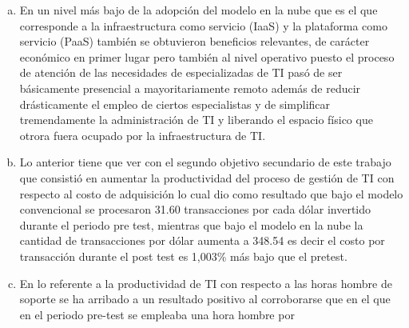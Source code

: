 \begin{enumerate}[a.]
          como consecuencia se obtuvo un incremento en las ventas de 12\% con
          respecto al periodo anterior. Nuevamente en este caso la manifestaci\'on
          tangible de beneficio se da por el porcentaje de incremento en las ventas,
          sin embargo se obtuvieron otros beneficios menos evidentes como la
          recolecci\'on de m\'etricas diversas sobre todo el proceso de ventas,
          la centralizaci\'on de la informaci\'on de los clientes, de modo que
          estos dejaron de ser propiedad de los representantes comerciales para
          pasar a ser clientes de la empresa, la disponibilidad de m\'ultiples
          an\'alisis provistos de manera autom\'atica por la aplicaci\'on y algo
          muy importante, la adopci\'on de las mejores pr\'acticas para el proceso
          de ventas las cuales vienen ya incorporadas en la soluci\'on adoptada.
    \item En un nivel m\'as bajo de la adopci\'on del modelo en la nube que es
          el que corresponde a la infraestructura como servicio (IaaS) y la
          plataforma como servicio (PaaS) tambi\'en se obtuvieron beneficios
          relevantes, de car\'acter econ\'omico en primer lugar pero tambi\'en
          al nivel operativo puesto el proceso de atenci\'on de las necesidades
          de especializadas de TI pas\'o de ser b\'asicamente presencial a
          mayoritariamente remoto adem\'as de reducir dr\'asticamente el empleo
          de ciertos especialistas y de simplificar tremendamente la administraci\'on
          de TI y liberando el espacio f\'isico que otrora fuera ocupado por la
          infraestructura de TI.
    \item Lo anterior tiene que ver con el segundo objetivo secundario de este
          trabajo que consisti\'o en aumentar la productividad del proceso de
          gesti\'on de TI con respecto al costo de adquisici\'on lo cual dio como
          resultado que bajo el modelo convencional se procesaron 31.60 transacciones
          por cada d\'olar invertido durante el periodo pre test, mientras que
          bajo el modelo en la nube la cantidad de transacciones por d\'olar
          aumenta a 348.54 es decir el costo por transacci\'on durante el post
          test es 1,003\% m\'as bajo que el pretest.
    \item En lo referente a la productividad de TI con respecto a las horas
          hombre de soporte se ha arribado a un resultado positivo al corroborarse
          que en el que en el periodo pre-test se empleaba una hora hombre por

\end{enumerate}
